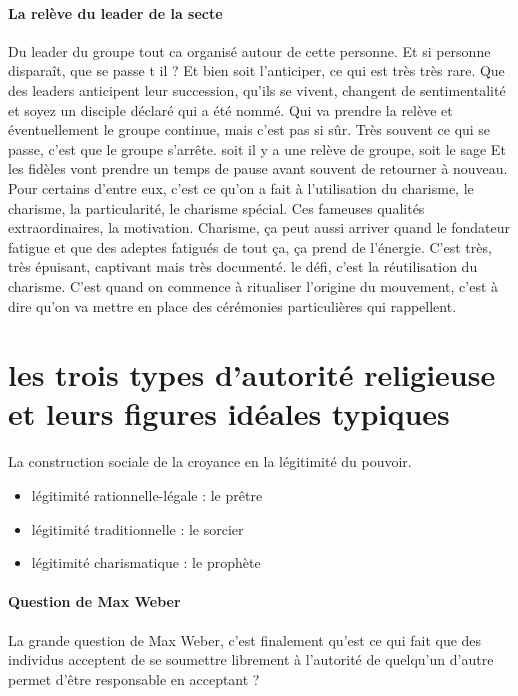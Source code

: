 \paragraph{La relève du leader de la secte}
Du leader du groupe tout ca organisé autour de cette personne.
Et  si personne disparaît, que se passe t il ? Et bien soit l'anticiper, ce qui est très très rare. Que des leaders anticipent leur succession, qu'ils se vivent, changent de sentimentalité et  soyez un disciple déclaré qui a été nommé.
Qui va prendre la relève et éventuellement le groupe continue, mais c'est pas si sûr.
Très souvent ce qui se passe, c'est que le groupe s'arrête.  soit il y a une relève de groupe, soit le sage Et les fidèles vont prendre un temps de pause avant souvent de retourner à  nouveau.  
  Pour certains d'entre eux, c'est ce qu'on a fait à  l'utilisation du charisme, le charisme, la particularité, le charisme spécial.
Ces fameuses qualités extraordinaires, la motivation. Charisme, ça peut aussi arriver quand le fondateur fatigue et que des adeptes fatigués de tout ça, ça prend de l'énergie.
C'est très, très épuisant, captivant mais très documenté. le défi, c'est la réutilisation du charisme. C'est quand on commence à  ritualiser l'origine du mouvement, c'est à  dire qu'on va mettre en place des cérémonies particulières qui rappellent.


 \section{les trois types d'autorité religieuse et leurs figures idéales typiques}
La construction sociale de la croyance en la légitimité du pouvoir.
\begin{itemize}
    \item  légitimité rationnelle-légale : le prêtre
    \item légitimité traditionnelle : le sorcier
    \item légitimité charismatique : le prophète
\end{itemize}



\paragraph{Question de Max Weber} La grande question de Max Weber, c'est finalement qu'est ce qui fait que des individus acceptent de se soumettre librement à l'autorité de quelqu'un d'autre permet d'être responsable en acceptant ?
 

